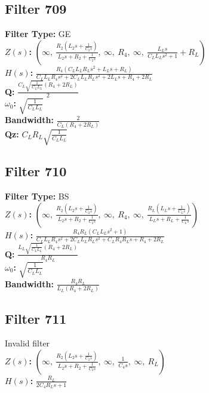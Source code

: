 \documentclass{article}
\begin{document}
\subsection*{Filter 709}
\textbf{Filter Type:} GE \\ 
\textbf{$Z(s)$:} $\left( \infty, \  \frac{R_{2} \left(L_{2} s + \frac{1}{C_{2} s}\right)}{L_{2} s + R_{2} + \frac{1}{C_{2} s}}, \  \infty, \  R_{4}, \  \infty, \  \frac{L_{L} s}{C_{L} L_{L} s^{2} + 1} + R_{L}\right)$ \\ 
\textbf{$H(s)$:} $\frac{R_{4} \left(C_{L} L_{L} R_{L} s^{2} + L_{L} s + R_{L}\right)}{C_{L} L_{L} R_{4} s^{2} + 2 C_{L} L_{L} R_{L} s^{2} + 2 L_{L} s + R_{4} + 2 R_{L}}$ \\ 
\textbf{Q:} $\frac{C_{L} \sqrt{\frac{1}{C_{L} L_{L}}} \left(R_{4} + 2 R_{L}\right)}{2}$ \\ 
\textbf{$\omega_0$:} $\sqrt{\frac{1}{C_{L} L_{L}}}$ \\ 
\textbf{Bandwidth:} $\frac{2}{C_{L} \left(R_{4} + 2 R_{L}\right)}$ \\ 
\textbf{Qz:} $C_{L} R_{L} \sqrt{\frac{1}{C_{L} L_{L}}}$ \\ 
\subsection*{Filter 710}
\textbf{Filter Type:} BS \\ 
\textbf{$Z(s)$:} $\left( \infty, \  \frac{R_{2} \left(L_{2} s + \frac{1}{C_{2} s}\right)}{L_{2} s + R_{2} + \frac{1}{C_{2} s}}, \  \infty, \  R_{4}, \  \infty, \  \frac{R_{L} \left(L_{L} s + \frac{1}{C_{L} s}\right)}{L_{L} s + R_{L} + \frac{1}{C_{L} s}}\right)$ \\ 
\textbf{$H(s)$:} $\frac{R_{4} R_{L} \left(C_{L} L_{L} s^{2} + 1\right)}{C_{L} L_{L} R_{4} s^{2} + 2 C_{L} L_{L} R_{L} s^{2} + C_{L} R_{4} R_{L} s + R_{4} + 2 R_{L}}$ \\ 
\textbf{Q:} $\frac{L_{L} \sqrt{\frac{1}{C_{L} L_{L}}} \left(R_{4} + 2 R_{L}\right)}{R_{4} R_{L}}$ \\ 
\textbf{$\omega_0$:} $\sqrt{\frac{1}{C_{L} L_{L}}}$ \\ 
\textbf{Bandwidth:} $\frac{R_{4} R_{L}}{L_{L} \left(R_{4} + 2 R_{L}\right)}$ \\ 
\subsection*{Filter 711}
Invalid filter \\ 
\textbf{$Z(s)$:} $\left( \infty, \  \frac{R_{2} \left(L_{2} s + \frac{1}{C_{2} s}\right)}{L_{2} s + R_{2} + \frac{1}{C_{2} s}}, \  \infty, \  \frac{1}{C_{4} s}, \  \infty, \  R_{L}\right)$ \\ 
\textbf{$H(s)$:} $\frac{R_{L}}{2 C_{4} R_{L} s + 1}$ \\ 
\end{document}
